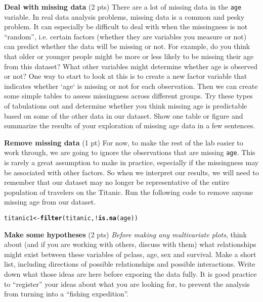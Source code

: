 \documentclass{article}\usepackage[]{graphicx}\usepackage[]{color}
\makeatletter
\newcommand{\hlopt}[1]{\textcolor[rgb]{0,0,0}{#1}}%
\newcommand{\hlstd}[1]{\textcolor[rgb]{0.345,0.345,0.345}{#1}}%
\newcommand{\hlkwb}[1]{\textcolor[rgb]{0.69,0.353,0.396}{#1}}%
\newcommand{\hlkwd}[1]{\textcolor[rgb]{0.737,0.353,0.396}{\textbf{#1}}}%
\newenvironment{kframe}{%
 \def\at@end@of@kframe{}%
 \ifinner\ifhmode%
  \def\at@end@of@kframe{\end{minipage}}%
  \begin{minipage}{\columnwidth}%
 \fi\fi%
 \def\FrameCommand##1{\hskip\@totalleftmargin \hskip-\fboxsep
 \colorbox{shadecolor}{##1}\hskip-\fboxsep
     \hskip-\linewidth \hskip-\@totalleftmargin \hskip\columnwidth}%
 \MakeFramed {\advance\hsize-\width
   \@totalleftmargin\z@ \linewidth\hsize
   \@setminipage}}%
 {\par\unskip\endMakeFramed%
 \at@end@of@kframe}
\newenvironment{knitrout}{}{} %
\makeatother
\begin{document}
\begin{exercise}
{\bf Deal with missing data}  (2 pts) There are a lot of missing data in the {\tt age} variable. In real data analysis problems, missing data is a common and pesky problem. It can especially be difficult to deal with when the missingness is not ``random'', i.e. certain factors (whether they are variables you measure or not) can predict whether the data will be missing or not. For example, do you think that older or younger people might be more or less likely to be missing their age from this dataset? What other variables might determine whether age is observed or not? One way to start to look at this is to create a new factor variable that indicates whether `age` is missing or not for each observation. Then we can create some simple tables to assess missingness across different groups. Try these types of tabulations out and determine whether you think missing age is predictable based on some of the other data in our dataset. Show one table or figure and summarize the results of your exploration of missing age data in a few sentences.


\end{exercise}

\begin{exercise}
{\bf Remove missing data} (1 pt)
For now, to make the rest of the lab easier to work through, we are going to ignore the observations that are missing {\tt age}. This is rarely a great assumption to make in practice, especially if the missingness may be associated with other factors. So when we interpret our results, we will need to remember that our dataset may no longer be representative of the entire population of travelers on the Titanic. Run the following code to remove anyone missing age from our dataset.

\begin{knitrout}
\color{fgcolor}\begin{kframe}
\begin{alltt}
\hlstd{titanic1} \hlkwb{<-} \hlkwd{filter}\hlstd{(titanic,} \hlopt{!}\hlkwd{is.na}\hlstd{(age))}
\end{alltt}
\end{kframe}
\end{knitrout}

\end{exercise}



\begin{exercise}
{\bf Make some hypotheses}  (2 pts) 
{\em Before making any multivariate plots}, think about (and if you are working with others, discuss with them) what relationships might exist between these variables of pclass, age, sex and survival. Make a short list, including directions of possible relationships and possible interactions. Write down what those ideas are here before exporing the data fully. It is good practice to ``register'' your ideas about what you are looking for, to prevent the analysis from turning into a ``fishing expedition''.
\end{exercise}
\end{document}

